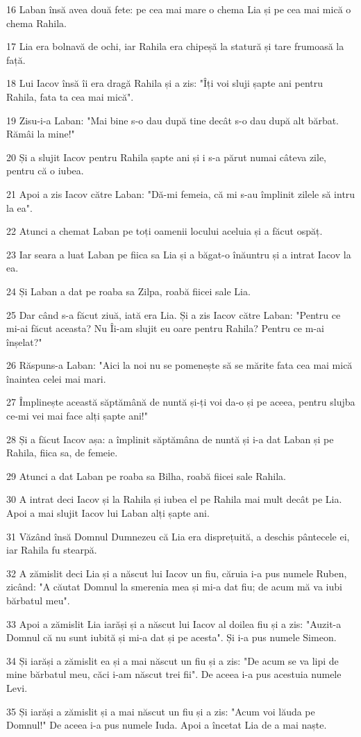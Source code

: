 \par 16 Laban însă avea două fete: pe cea mai mare o chema Lia și pe cea mai mică o chema Rahila.
\par 17 Lia era bolnavă de ochi, iar Rahila era chipeșă la statură și tare frumoasă la față.
\par 18 Lui Iacov însă îi era dragă Rahila și a zis: "Îți voi sluji șapte ani pentru Rahila, fata ta cea mai mică".
\par 19 Zisu-i-a Laban: "Mai bine s-o dau după tine decât s-o dau după alt bărbat. Rămâi la mine!"
\par 20 Și a slujit Iacov pentru Rahila șapte ani și i s-a părut numai câteva zile, pentru că o iubea.
\par 21 Apoi a zis Iacov către Laban: "Dă-mi femeia, că mi s-au împlinit zilele să intru la ea".
\par 22 Atunci a chemat Laban pe toți oamenii locului aceluia și a făcut ospăț.
\par 23 Iar seara a luat Laban pe fiica sa Lia și a băgat-o înăuntru și a intrat Iacov la ea.
\par 24 Și Laban a dat pe roaba sa Zilpa, roabă fiicei sale Lia.
\par 25 Dar când s-a făcut ziuă, iată era Lia. Și a zis Iacov către Laban: "Pentru ce mi-ai făcut aceasta? Nu Îi-am slujit eu oare pentru Rahila? Pentru ce m-ai înșelat?"
\par 26 Răspuns-a Laban: "Aici la noi nu se pomenește să se mărite fata cea mai mică înaintea celei mai mari.
\par 27 Împlinește această săptămână de nuntă și-ți voi da-o și pe aceea, pentru slujba ce-mi vei mai face alți șapte ani!"
\par 28 Și a făcut Iacov așa: a împlinit săptămâna de nuntă și i-a dat Laban și pe Rahila, fiica sa, de femeie.
\par 29 Atunci a dat Laban pe roaba sa Bilha, roabă fiicei sale Rahila.
\par 30 A intrat deci Iacov și la Rahila și iubea el pe Rahila mai mult decât pe Lia. Apoi a mai slujit Iacov lui Laban alți șapte ani.
\par 31 Văzând însă Domnul Dumnezeu că Lia era disprețuită, a deschis pântecele ei, iar Rahila fu stearpă.
\par 32 A zămislit deci Lia și a născut lui Iacov un fiu, căruia i-a pus numele Ruben, zicând: "A căutat Domnul la smerenia mea și mi-a dat fiu; de acum mă va iubi bărbatul meu".
\par 33 Apoi a zămislit Lia iarăși și a născut lui Iacov al doilea fiu și a zis: "Auzit-a Domnul că nu sunt iubită și mi-a dat și pe acesta". Și i-a pus numele Simeon.
\par 34 Și iarăși a zămislit ea și a mai născut un fiu și a zis: "De acum se va lipi de mine bărbatul meu, căci i-am născut trei fii". De aceea i-a pus acestuia numele Levi.
\par 35 Și iarăși a zămislit și a mai născut un fiu și a zis: "Acum voi lăuda pe Domnul!" De aceea i-a pus numele Iuda. Apoi a încetat Lia de a mai naște.

